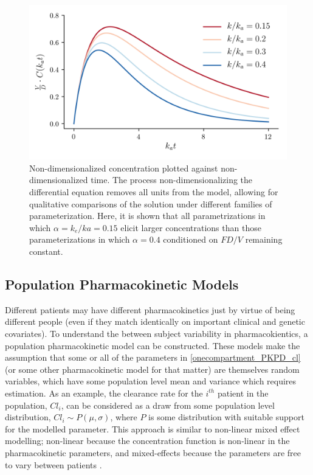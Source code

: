 \begin{figure}[h!]
	\centering
	\includegraphics{figures/pkcurves.png}
	\caption[Non-dimensionalized solutions to pharmacokinetic differential equation] {Non-dimensionalized concentration plotted against non-dimensionalized time.  The process non-dimensionalizing the differential equation removes all units from the model, allowing for qualitative comparisons of the solution under different families of parameterization.  Here, it is shown that all parametrizations in which $\alpha = k_e/ka = 0.15$ elicit larger concentrations than those parameterizations in which $\alpha=0.4$ conditioned on $FD/V$ remaining constant.}
	\label{fig:pkcureves}
\end{figure}

\subsection{Population Pharmacokinetic Models}

Different patients may have different pharmacokinetics just by virtue of being different people (even if they match identically on important clinical and genetic covariates).  To understand the between subject variability in pharmacokientics, a population pharmacokinetic model can be constructed.  These models make the assumption that some or all of the parameters in \cref{onecompartment_PKPD_cl} (or some other pharmacokinetic model for that matter) are themselves random variables, which have some population level mean and variance which requires estimation.  As an example, the clearance rate for the $i^{th}$ patient in the population, $Cl_i$, can be considered as a draw from some population level distribution, $Cl_i \sim P(\mu, \sigma) $, where $P$ is some distribution with suitable support for the modelled parameter.  This approach is similar to non-linear mixed effect modelling; non-linear because the concentration function is non-linear in the pharmacokinetic parameters, and mixed-effects because the parameters are free to vary between patients \cite{mould2013basic}.

